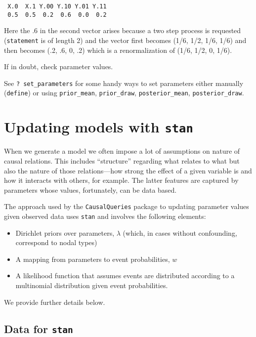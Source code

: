 \documentclass[
  12pt,
]{book}
\providecommand{\tightlist}{%
  \setlength{\itemsep}{0pt}\setlength{\parskip}{0pt}}
\begin{document}
\begin{verbatim}
 X.0  X.1 Y.00 Y.10 Y.01 Y.11 
 0.5  0.5  0.2  0.6  0.0  0.2 
\end{verbatim}

Here the .6 in the second vector arises because a two step process is requested (\texttt{statement} is of length 2) and the vector first becomes (1/6, 1/2, 1/6, 1/6) and then becomes (.2, .6, 0, .2) which is a renormalization of (1/6, 1/2, 0, 1/6).

If in doubt, check parameter values.

See \texttt{?\ set\_parameters} for some handy ways to set parameters either manually (\texttt{define}) or using \texttt{prior\_mean}, \texttt{prior\_draw}, \texttt{posterior\_mean}, \texttt{posterior\_draw}.

\hypertarget{updating-models-with-stan}{%
\chapter{\texorpdfstring{Updating models with \texttt{stan}}{Updating models with stan}}\label{updating-models-with-stan}}

When we generate a model we often impose a lot of assumptions on nature of causal relations. This includes ``structure'' regarding what relates to what but also the nature of those relations---how strong the effect of a given variable is and how it interacts with others, for example. The latter features are captured by parameters whose values, fortunately, can be data based.

The approach used by the \texttt{CausalQueries} package to updating parameter values given observed data uses \texttt{stan} and involves the following elements:

\begin{itemize}
\tightlist
\item
  Dirichlet priors over parameters, \(\lambda\) (which, in cases without confounding, correspond to nodal types)
\item
  A mapping from parameters to event probabilities, \(w\)
\item
  A likelihood function that assumes events are distributed according to a multinomial distribution given event probabilities.
\end{itemize}

We provide further details below.

\hypertarget{data-for-stan}{%
\section{\texorpdfstring{Data for \texttt{stan}}{Data for stan}}\label{data-for-stan}}
\end{document}
